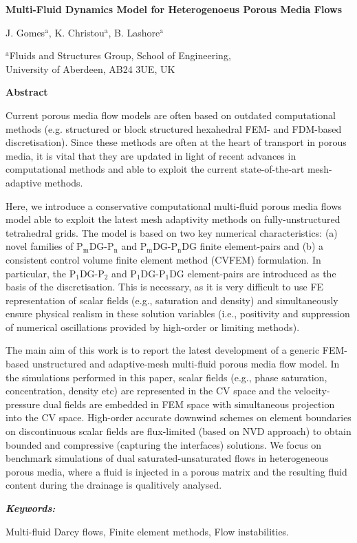 \documentclass[12pts,a4paper,amsmath,amssymb,floatfix]{article}
\begin{document}
\begin{center}
{\Large{ \bf Multi-Fluid Dynamics Model for Heterogenoeus Porous Media Flows}}


J. Gomes$^{\text{a}}$, K. Christou$^{\text{a}}$, B. Lashore$^{\text{a}}$

$^{\text{a}}$Fluids and Structures Group, School of Engineering, \\
University of Aberdeen, AB24 3UE, UK

\end{center}


\noindent
{\large{\bf Abstract}}

\noindent
Current porous media flow models are often based on outdated computational methods (e.g. structured or block structured hexahedral FEM- and FDM-based discretisation). Since these methods are often at the heart of transport in porous media, it is vital that they are updated in light of recent advances in computational methods and able to exploit the current state-of-the-art mesh-adaptive methods. 

\noindent
Here, we introduce a conservative computational multi-fluid porous media flows model able to exploit the latest mesh adaptivity methods on fully-unstructured tetrahedral grids. The model is based on two key numerical characteristics: (a) novel families of P$_{\text{m}}$DG-P$_{\text{n}}$ and P$_{\text{m}}$DG-P$_{\text{n}}$DG finite element-pairs and (b) a consistent control volume finite element method (CVFEM) formulation. In particular, the P$_{\text{1}}$DG-P$_{\text{2}}$ and P$_{\text{1}}$DG-P$_{\text{1}}$DG element-pairs are introduced as the basis of the discretisation. This is necessary, as it is very difficult to use FE representation of scalar fields (e.g., saturation and density) and simultaneously ensure physical realism in these solution variables (i.e., positivity and suppression of numerical oscillations provided by high-order or limiting methods). 

\noindent
The main aim of this work is to report the latest development of a generic FEM-based unstructured and adaptive-mesh multi-fluid porous media flow model. In the simulations performed in this paper, scalar fields (e.g., phase saturation, concentration, density etc) are represented in the CV space and the velocity-pressure dual fields are embedded in FEM space with simultaneous projection into the CV space. High-order accurate downwind schemes on element boundaries on discontinuous scalar fields are flux-limited (based on NVD approach) to obtain bounded and compressive (capturing the interfaces) solutions. We focus on benchmark simulations of dual saturated-unsaturated flows in heterogeneous porous media, where a fluid is injected in a porous matrix and the resulting fluid content during the drainage is qualitively analysed.

\medskip
\noindent
{\it{\bf Keywords:}}

\noindent
Multi-fluid Darcy flows, Finite element methods, Flow instabilities.
 
\end{document}
